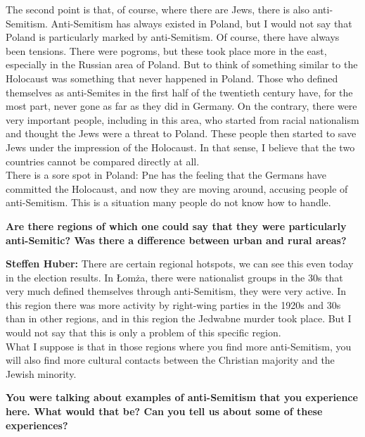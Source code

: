 The second point is that, of course, where there are Jews, there is also anti-Semitism. Anti-Semitism has always existed in Poland, but I would not say that Poland is particularly marked by anti-Semitism. Of course, there have always been tensions. There were pogroms, but these took place more in the east, especially in the Russian area of Poland. But to think of something similar to the Holocaust was something that never happened in Poland. Those who defined themselves as anti-Semites in the first half of the twentieth century have, for the most part, never gone as far as they did in Germany. On the contrary, there were very important people, including in this area, who started from racial nationalism and thought the Jews were a threat to Poland. These people then started to save Jews under the impression of the Holocaust. In that sense, I believe that the two countries cannot be compared directly at all.\\
There is a sore spot in Poland: Pne has the feeling that the Germans have committed the Holocaust, and now they are moving around, accusing people of anti-Semitism. This is a situation many people do not know how to handle. 

\textbf{Are there regions of which one could say that they were particularly anti-Semitic? Was there a difference between urban and rural areas?} 

\textbf{Steffen Huber:} There are certain regional hotspots, we can see this even today in the election results. In Łomża, there were nationalist groups in the 30s that very much defined themselves through anti-Semitism, they were very active. In this region there was more activity by right-wing parties in the 1920s and 30s than in other regions, and in this region the Jedwabne murder took place. But I would not say that this is only a problem of this specific region.\\
What I suppose is that in those regions where you find more anti-Semitism, you will also find more cultural contacts between the Christian majority and the Jewish minority. 

\textbf{You were talking about examples of anti-Semitism that you experience here. What would that be? Can you tell us about some of these experiences?} 

